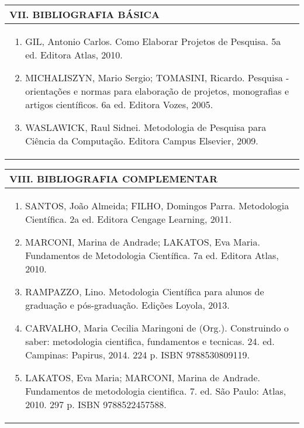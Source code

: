 \documentclass[12pt]{article}
\begin{document}
\begin{longtable}{|L{1.025\textwidth}|} \hline
%
{\bf VII. BIBLIOGRAFIA BÁSICA} \\ \hline

\begin{enumerate}
\item GIL, Antonio Carlos. Como Elaborar Projetos de Pesquisa. 5a ed. Editora Atlas, 2010. 
\item MICHALISZYN, Mario Sergio; TOMASINI, Ricardo. Pesquisa - orientações e normas para elaboração de projetos, monografias e artigos científicos. 6a ed. Editora Vozes, 2005. 
\item WASLAWICK, Raul Sidnei. Metodologia de Pesquisa para Ciência da Computação. Editora Campus Elsevier, 2009.
\end{enumerate}

 \\ \hline
\end{longtable}



\begin{longtable}{|L{1.025\textwidth}|} \hline
%
{\bf VIII. BIBLIOGRAFIA COMPLEMENTAR} \\ \hline
\begin{enumerate}
\item SANTOS, João Almeida; FILHO, Domingos Parra. Metodologia Científica. 2a ed. Editora Cengage Learning, 2011. 
\item MARCONI, Marina de Andrade; LAKATOS, Eva Maria. Fundamentos de Metodologia Científica. 7a ed. Editora Atlas, 2010. 
\item RAMPAZZO, Lino. Metodologia Científica para alunos de graduação e pós-graduação. Edições Loyola, 2013.
\item CARVALHO, Maria Cecilia Maringoni de (Org.). Construindo o saber: metodologia cientifica, fundamentos e tecnicas. 24. ed. Campinas: Papirus, 2014. 224 p. ISBN 9788530809119.
\item LAKATOS, Eva Maria; MARCONI, Marina de Andrade. Fundamentos de metodologia cientifica. 7. ed. São Paulo: Atlas, 2010. 297 p. ISBN 9788522457588.

%
\end{enumerate}
 \\ \hline
\end{longtable}



\end{document}
